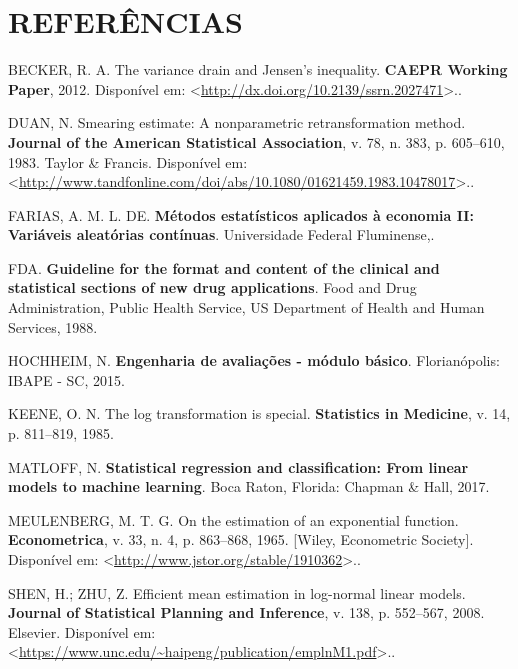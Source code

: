 \documentclass[a4paper]{article}
\begin{document}
\section*{REFERÊNCIAS}\label{referencias}

\hypertarget{refs}{}
\hypertarget{ref-becker}{}
BECKER, R. A. The variance drain and Jensen's inequality. \textbf{CAEPR
Working Paper}, 2012. Disponível em:
\textless{}\url{http://dx.doi.org/10.2139/ssrn.2027471}\textgreater{}..

\hypertarget{ref-Duan}{}
DUAN, N. Smearing estimate: A nonparametric retransformation method.
\textbf{Journal of the American Statistical Association}, v. 78, n. 383,
p. 605--610, 1983. Taylor \& Francis. Disponível em:
\textless{}\url{http://www.tandfonline.com/doi/abs/10.1080/01621459.1983.10478017}\textgreater{}..

\hypertarget{ref-farias}{}
FARIAS, A. M. L. DE. \textbf{Métodos estatísticos aplicados à economia
II: Variáveis aleatórias contínuas}. Universidade Federal Fluminense,.

\hypertarget{ref-fda}{}
FDA. \textbf{Guideline for the format and content of the clinical and
statistical sections of new drug applications}. Food and Drug
Administration, Public Health Service, US Department of Health and Human
Services, 1988.

\hypertarget{ref-hochheim}{}
HOCHHEIM, N. \textbf{Engenharia de avaliações - módulo básico}.
Florianópolis: IBAPE - SC, 2015.

\hypertarget{ref-keene}{}
KEENE, O. N. The log transformation is special. \textbf{Statistics in
Medicine}, v. 14, p. 811--819, 1985.

\hypertarget{ref-matloff2017}{}
MATLOFF, N. \textbf{Statistical regression and classification: From
linear models to machine learning}. Boca Raton, Florida: Chapman \&
Hall, 2017.

\hypertarget{ref-meulenberg1965}{}
MEULENBERG, M. T. G. On the estimation of an exponential function.
\textbf{Econometrica}, v. 33, n. 4, p. 863--868, 1965. {[}Wiley,
Econometric Society{]}. Disponível em:
\textless{}\url{http://www.jstor.org/stable/1910362}\textgreater{}..

\hypertarget{ref-shen}{}
SHEN, H.; ZHU, Z. Efficient mean estimation in log-normal linear models.
\textbf{Journal of Statistical Planning and Inference}, v. 138, p.
552--567, 2008. Elsevier. Disponível em:
\textless{}\url{https://www.unc.edu/~haipeng/publication/emplnM1.pdf}\textgreater{}..
\end{document}
